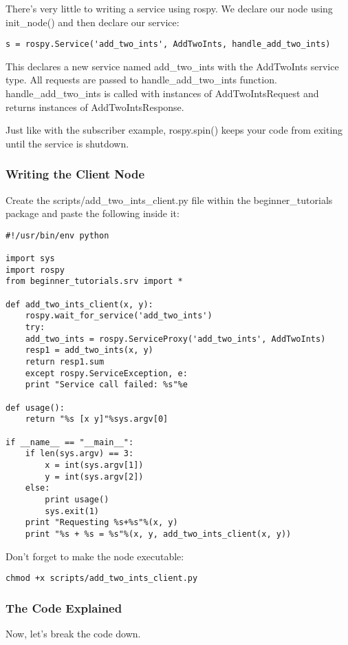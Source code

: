 There's very little to writing a service using rospy. We declare our node using init\_node() and then declare our service:

\begin{lstlisting}[breaklines=true languages=bash]
 s = rospy.Service('add_two_ints', AddTwoInts, handle_add_two_ints)
\end{lstlisting}

This declares a new service named add\_two\_ints with the AddTwoInts service type. All requests are passed to handle\_add\_two\_ints function. handle\_add\_two\_ints is called with instances of AddTwoIntsRequest and returns instances of AddTwoIntsResponse.

Just like with the subscriber example, rospy.spin() keeps your code from exiting until the service is shutdown.

\subsubsection{Writing the Client Node}
Create the scripts/add\_two\_ints\_client.py file within the beginner\_tutorials package and paste the following inside it:

\begin{lstlisting}[breaklines=true languages=bash]
#!/usr/bin/env python

import sys
import rospy
from beginner_tutorials.srv import *

def add_two_ints_client(x, y):
	rospy.wait_for_service('add_two_ints')
	try:
	add_two_ints = rospy.ServiceProxy('add_two_ints', AddTwoInts)
	resp1 = add_two_ints(x, y)
	return resp1.sum
	except rospy.ServiceException, e:
	print "Service call failed: %s"%e

def usage():
	return "%s [x y]"%sys.argv[0]

if __name__ == "__main__":
	if len(sys.argv) == 3:
		x = int(sys.argv[1])
		y = int(sys.argv[2])
	else:
		print usage()
		sys.exit(1)
	print "Requesting %s+%s"%(x, y)
	print "%s + %s = %s"%(x, y, add_two_ints_client(x, y))
\end{lstlisting}

Don't forget to make the node executable:

\begin{lstlisting}[breaklines=true languages=bash]
chmod +x scripts/add_two_ints_client.py
\end{lstlisting}

\subsubsection{The Code Explained}
Now, let's break the code down.


